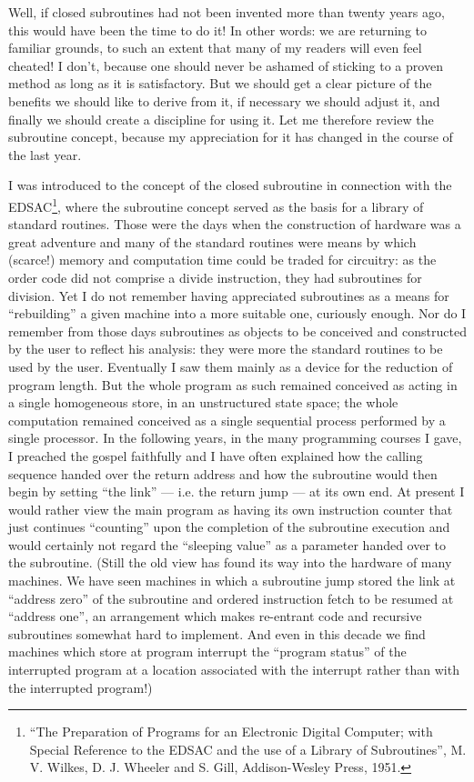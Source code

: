 Well, if closed subroutines had not been invented more than twenty years ago, this would have been the time to do it! In other words: we are returning to familiar grounds, to such an extent that many of my readers will even feel cheated! I don't, because one should never be ashamed of sticking to a proven method as long as it is satisfactory. But we should get a clear picture of the benefits we should like to derive from it, if necessary we should adjust it, and finally we should create a discipline for using it. Let me therefore review the subroutine concept, because my appreciation for it has changed in the course of the last year.

I was introduced to the concept of the closed subroutine in connection with the EDSAC\footnote{``The Preparation of Programs for an Electronic Digital Computer; with Special Reference to the EDSAC and the use of a Library of Subroutines'', M. V. Wilkes, D. J. Wheeler and S. Gill, Addison-Wesley Press, 1951.}, where the subroutine concept served as the basis for a library of standard routines. Those were the days when the construction of hardware was a great adventure and many of the standard routines were means by which (scarce!) memory and computation time could be traded for circuitry: as the order code did not comprise a divide instruction, they had subroutines for division. Yet I do not remember having appreciated subroutines as a means for ``rebuilding'' a given machine into a more suitable one, curiously enough. Nor do I remember from those days subroutines as objects to be conceived and constructed by the user to reflect his analysis: they were more the standard routines to be used by the user. Eventually I saw them mainly as a device for the reduction of program length. But the whole program as such remained conceived as acting in a single homogeneous store, in an unstructured state space; the whole computation remained conceived as a single sequential process performed by a single processor. In the following years, in the many programming courses I gave, I preached the gospel faithfully and I have often explained how the calling sequence handed over the return address and how the subroutine would then begin by setting ``the link'' --- i.e. the return jump --- at its own end. At present I would rather view the main program as having its own instruction counter that just continues ``counting'' upon the completion of the subroutine execution and would certainly not regard the ``sleeping value'' as a parameter handed over to the subroutine. (Still the old view has found its way into the hardware of many machines. We have seen machines in which a subroutine jump stored the link at ``address zero'' of the subroutine and ordered instruction fetch to be resumed at ``address one'', an arrangement which makes re-entrant code and recursive subroutines somewhat hard to implement. And even in this decade we find machines which store at program interrupt the ``program status'' of the interrupted program at a location associated with the interrupt rather than with the interrupted program!)

